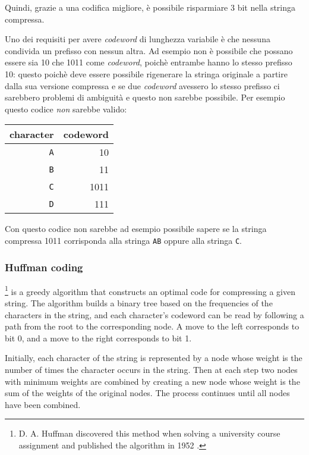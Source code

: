 Quindi, grazie a una codifica migliore, è possibile
risparmiare 3 bit nella stringa compressa.

Uno dei requisiti per avere \emph{codeword} di lunghezza variabile
è che nessuna condivida un prefisso con nessun altra.
Ad esempio non è possibile che possano essere sia
10 che 1011 come \emph{codeword}, poichè entrambe hanno 
lo stesso prefisso 10: questo poichè deve essere
possibile rigenerare la stringa originale a partire dalla
sua versione compressa e se due \emph{codeword} avessero
lo stesso prefisso ci sarebbero problemi di ambiguità e 
questo non sarebbe possibile.
Per esempio questo codice \emph{non} sarebbe valido:
\begin{center}
\begin{tabular}{rr}
character & codeword \\
\hline
\texttt{A} & 10 \\
\texttt{B} & 11 \\
\texttt{C} & 1011 \\
\texttt{D} & 111 \\
\end{tabular}
\end{center}
Con questo codice non sarebbe ad esempio possibile
sapere se la stringa compressa 1011 corrisponda alla 
stringa \texttt{AB} oppure alla stringa \texttt{C}.


\subsubsection{Huffman coding}

\footnote{D. A. Huffman discovered this method
when solving a university course assignment
and published the algorithm in 1952 \cite{huf52}.} is a greedy algorithm
that constructs an optimal code for
compressing a given string.
The algorithm builds a binary tree
based on the frequencies of the characters
in the string,
and each character's codeword can be read
by following a path from the root to
the corresponding node.
A move to the left corresponds to bit 0,
and a move to the right corresponds to bit 1.

Initially, each character of the string is
represented by a node whose weight is the
number of times the character occurs in the string.
Then at each step two nodes with minimum weights
are combined by creating
a new node whose weight is the sum of the weights
of the original nodes.
The process continues until all nodes have been combined.

